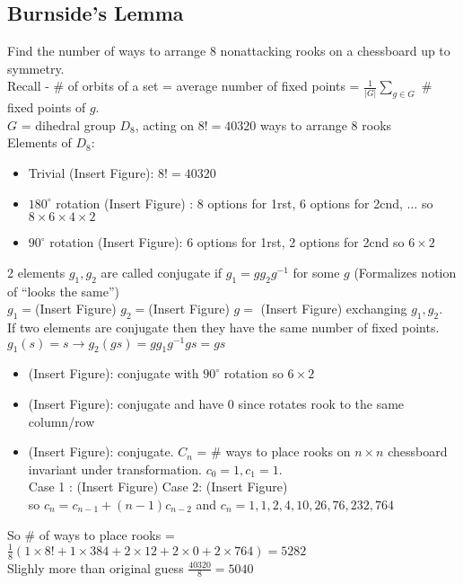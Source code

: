 
\subsection{Burnside's Lemma}

\begin{example}
    Find the number of ways to arrange 8 nonattacking rooks on a chessboard up to symmetry. \\
    Recall - \# of orbits of a set = average number of fixed points = $\frac{1}{|G|} \sum_{g \in G}$ \# fixed points of $g$. \\
    $G$ = dihedral group $D_8$, acting on $8! = 40320$ ways to arrange 8 rooks \\
    Elements of $D_8$: 
    \begin{itemize}
        \item Trivial (Insert Figure): $8! = 40320$ 
        \item $180^{\circ}$ rotation (Insert Figure) : 8 options for 1rst, 6 options for 2cnd, $\ldots$ so $8 \times 6 \times 4 \times 2$ 
        \item $90^{\circ}$ rotation (Insert Figure): 6 options for 1rst, 2 options for 2cnd so $6 \times 2$ 
    \end{itemize}
    2 elements $g_1,g_2$ are called conjugate if $g_1 = gg_2g^{-1}$ for some $g$ (Formalizes notion of ``looks the same'') \\
    $g_1 = $(Insert Figure) \quad $g_2=$(Insert Figure) \quad $g = $ (Insert Figure) exchanging $g_1, g_2$. \\
    If two elements are conjugate then they have the same number of fixed points. \\
    $g_1(s)=s \to g_2(gs) = gg_1g^{-1}gs = gs$ 
    \begin{itemize}
        \item (Insert Figure): conjugate with $90^{\circ}$ rotation so $6 \times 2$ 
        \item (Insert Figure): conjugate and have 0 since rotates rook to the same column/row 
        \item (Insert Figure): conjugate. $C_n$ = \# ways to place rooks on $n \times n$ chessboard invariant under transformation. $c_0 = 1, c_1 = 1$. \\
        Case 1 : (Insert Figure) \quad Case 2: (Insert Figure) \quad \\
        so $c_n = c_{n-1} + (n-1)c_{n-2}$ and $c_n = 1, 1, 2, 4, 10, 26, 76, 232, 764$ 
    \end{itemize}
    So \# of ways to place rooks = $\frac{1}{8}(1 \times 8! + 1 \times 384 + 2 \times 12 + 2 \times 0 + 2 \times 764)  =5282$ \\
    Slighly more than original guess $\frac{40320}{8} = 5040$ 
\end{example}

